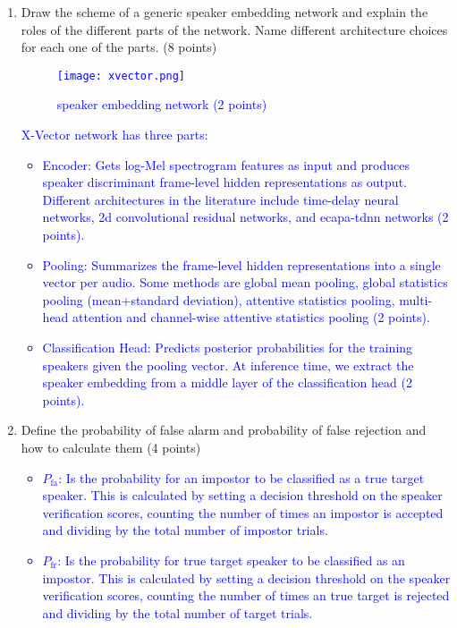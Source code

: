 \documentclass[12pt]{article}
\newcommand{\solution}[2]{\textcolor{blue}{\em #1}} %
\begin{document}
\begin{enumerate}
\item Draw the scheme of a generic speaker embedding network and explain the roles of the different parts of the network. Name different architecture choices for each one of the parts.   \hfill (8 points)\\
\solution{
\begin{figure}[h]
    \centering
    \texttt{[image: xvector.png]}
    \caption{speaker embedding network (2 points)}
\end{figure}
X-Vector network has three parts:
\begin{itemize}
    \item Encoder: Gets log-Mel spectrogram features as input and produces speaker discriminant frame-level hidden representations as output. Different architectures in the literature include time-delay neural networks, 2d convolutional residual networks, and ecapa-tdnn networks (2 points).
    \item Pooling: Summarizes the frame-level hidden representations into a single vector per audio. Some methods are global mean pooling, global statistics pooling (mean+standard deviation), attentive statistics pooling, multi-head attention and channel-wise attentive statistics pooling (2 points).
    \item Classification Head: Predicts posterior probabilities for the training speakers given the pooling vector. At inference time, we extract the speaker embedding from a middle layer of the classification head (2 points).
\end{itemize}
}{\vspace{5cm}}
\newpage 

\item Define the probability of false alarm and probability of false rejection and how to calculate them \hfill (4 points) \\
\solution{\begin{itemize}
\item $P_\text{fa}$: Is the probability for an impostor to be classified as a true target speaker. This is calculated by setting a decision threshold on the speaker verification scores, counting the number of times an impostor is accepted and dividing by the total number of impostor trials.
\item $P_\text{fr}$: Is the probability for true target speaker to be classified as an impostor. This is calculated by setting a decision threshold on the speaker verification scores, counting the number of times an true target is rejected and dividing by the total number of target trials.
\end{itemize}
}{\vspace{5cm}}


\end{enumerate}
\end{document}
